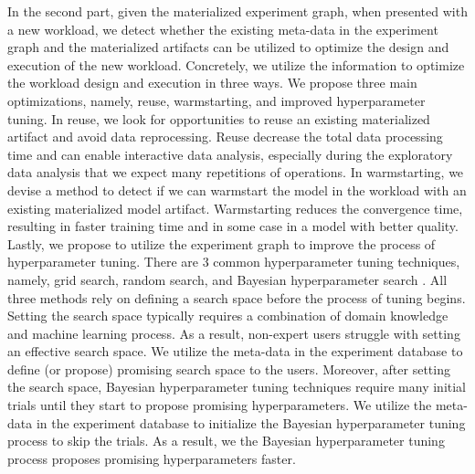 In the second part, given the materialized experiment graph, when presented with a new workload, we detect whether the existing meta-data in the experiment graph and the materialized artifacts can be utilized to optimize the design and execution of the new workload.
Concretely, we utilize the information to optimize the workload design and execution in three ways.
We propose three main optimizations, namely, reuse, warmstarting, and improved hyperparameter tuning.
In reuse, we look for opportunities to reuse an existing materialized artifact and avoid data reprocessing.
Reuse decrease the total data processing time and can enable interactive data analysis, especially during the exploratory data analysis that we expect many repetitions of operations.
In warmstarting, we devise a method to detect if we can warmstart the model in the workload with an existing materialized model artifact.
Warmstarting reduces the convergence time, resulting in faster training time and in some case in a model with better quality.
Lastly, we propose to utilize the experiment graph to improve the process of hyperparameter tuning.
There are 3 common hyperparameter tuning techniques, namely, grid search, random search, and Bayesian hyperparameter search \cite{hutter2011sequential,snoek2012practical}.
All three methods rely on defining a search space before the process of tuning begins.
Setting the search space typically requires a combination of domain knowledge and machine learning process.
As a result, non-expert users struggle with setting an effective search space.
We utilize the meta-data in the experiment database to define (or propose) promising search space to the users.
Moreover, after setting the search space, Bayesian hyperparameter tuning techniques require many initial trials until they start to propose promising hyperparameters.
We utilize the meta-data in the experiment database to initialize the Bayesian hyperparameter tuning process to skip the trials.
As a result, we the Bayesian hyperparameter tuning process proposes promising hyperparameters faster.

